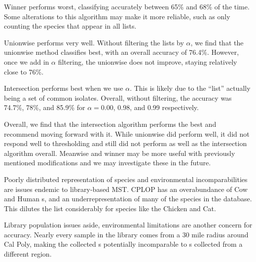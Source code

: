 Winner performs worst, classifying accurately between 65\% and 68\% of the time. Some alterations to this algorithm may make it more reliable, such as only counting the species that appear in all lists.

Unionwise performs very well. Without filtering the \knn{} lists by $\alpha$, we find that the unionwise method classifies best, with an overall accuracy of 76.4\%. However, once we add in $\alpha$ filtering, the unionwise does not improve, staying relatively close to 76\%. 

Intersection performs best when we use $\alpha$. This is likely due to the ``list'' actually being a set of common isolates. Overall, without filtering, the accuracy was 74.7\%, 78\%, and 85.9\% for $\alpha = $0.00, 0.98, and 0.99 respectively. 

Overall, we find that the intersection algorithm performs the best and recommend moving forward with it. While unionwise did perform well, it did not respond well to thresholding and still did not perform as well as the intersection algorithm overall. Meanwise and winner may be more useful with previously mentioned modifications and we may investigate these in the future.


Poorly distributed representation of species and environmental incomparabilities are issues endemic to library-based MST. CPLOP has an overabundance of Cow and Human \isol{}s, and an underrepresentation of many of the species in the database. This dilutes the \knn{} list considerably for species like the Chicken and Cat. 

Library population issues aside, environmental limitations are another concern for accuracy. Nearly every sample in the library comes from a 30 mile radius around Cal Poly, making the collected \pyro{}s potentially incomparable to \pyro{}s collected from a different region.

